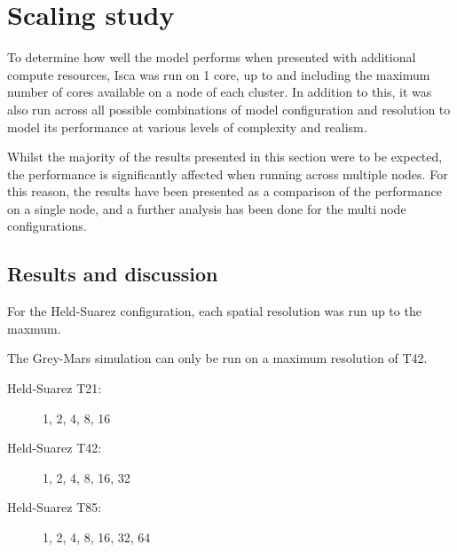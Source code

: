 \documentclass[a4paper,11pt]{report}
\begin{document}
\section{Scaling study}
To determine how well the model performs when presented with additional compute resources, Isca was run on 1 core, up to and including the maximum number of cores available on a node of each cluster. In addition to this, it was also run across all possible combinations of model configuration and resolution to model its performance at various levels of complexity and realism.  
\par
Whilst the majority of the results presented in this section were to be expected, the performance is significantly affected when running across multiple nodes. For this reason, the results have been presented as a comparison of the performance on a single node, and a further analysis has been done for the multi node configurations.

\subsection{Results and discussion}
For the Held-Suarez configuration, each spatial resolution was run up to the maxmum. 
\par
The Grey-Mars simulation can only be run on a maximum resolution of T42. 

\begin{description}
	\item[Held-Suarez T21: ] 1, 2, 4, 8, 16
	\item[Held-Suarez T42: ] 1, 2, 4, 8, 16, 32
	\item[Held-Suarez T85: ] 1, 2, 4, 8, 16, 32, 64
\end{description}
\end{document}
